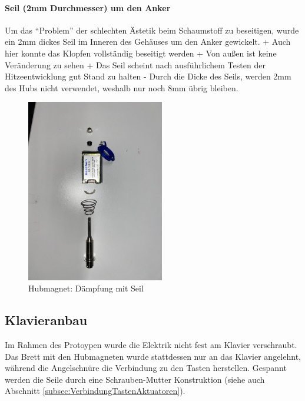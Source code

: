 \paragraph{Seil (2mm Durchmesser) um den Anker}

Um das \enquote{Problem} der schlechten Ästetik beim Schaumstoff zu beseitigen, wurde ein 2mm dickes Seil im Inneren des Gehäuses um den Anker gewickelt. \newline
+ Auch hier konnte das Klopfen vollständig beseitigt werden \newline
+ Von außen ist keine Veränderung zu sehen \newline
+ Das Seil scheint nach ausführlichem Testen der Hitzeentwicklung gut Stand zu halten  \newline
- Durch die Dicke des Seils, werden 2mm des Hubs nicht verwendet, weshalb nur noch 8mm übrig bleiben.

\begin{figure}[htbp]
    \centering
    \includegraphics [width=6cm] {img/Hubmagnet_Seil_Daempfung.jpg}
    \caption{Hubmagnet: Dämpfung mit Seil}
\end{figure}


\subsection{Klavieranbau}
Im Rahmen des Protoypen wurde die Elektrik nicht fest am Klavier verschraubt.
Das Brett mit den Hubmagneten wurde stattdessen nur an das Klavier angelehnt, während die Angelschnüre die Verbindung zu den Tasten herstellen.
Gespannt werden die Seile durch eine Schrauben-Mutter Konstruktion (siehe auch Abschnitt \ref{subsec:VerbindungTastenAktuatoren}).

